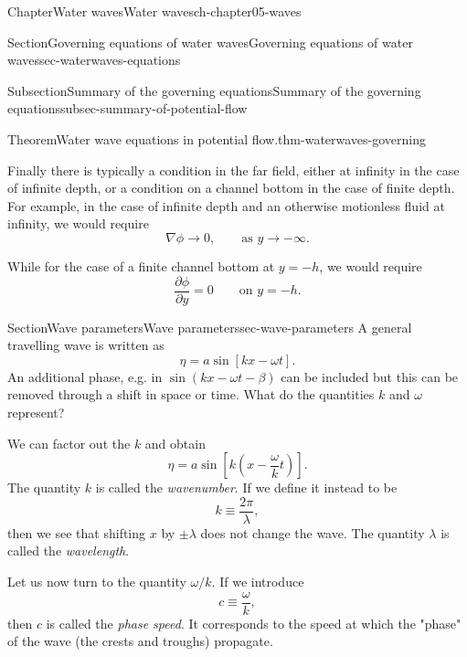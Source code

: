 \documentclass[oneside,10pt,]{book}
\numberwithin{equation}{section}
\newcommand{\pd}[2]{\frac{\partial#1}{\partial#2}}
\begin{document}
\begin{chapterptx}{Chapter}{Water waves}{}{Water waves}{}{}{ch-chapter05-waves}
\begin{sectionptx}{Section}{Governing equations of water waves}{}{Governing equations of water waves}{}{}{sec-waterwaves-equations}
\begin{subsectionptx}{Subsection}{Summary of the governing equations}{}{Summary of the governing equations}{}{}{subsec-summary-of-potential-flow}
\begin{theorem}{Theorem}{Water wave equations in potential flow.}{}{thm-waterwaves-governing}
%
\par
Finally there is typically a condition in the far field, either at infinity in the case of infinite depth, or a condition on a channel bottom in the case of finite depth. For example, in the case of infinite depth and an otherwise motionless fluid at infinity, we would require%
\begin{equation*}
\nabla \phi \to 0, \qquad \text{as $y \to -\infty$}.
\end{equation*}
%
\par
While for the case of a finite channel bottom at \(y = -h\), we would require%
\begin{equation*}
\pd{\phi}{y} = 0 \qquad \text{on $y = -h$}.
\end{equation*}
%
\end{theorem}
\end{subsectionptx}
\end{sectionptx}
%
%
\typeout{************************************************}
\typeout{************************************************}
%
\begin{sectionptx}{Section}{Wave parameters}{}{Wave parameters}{}{}{sec-wave-parameters}
A general travelling wave is written as%
\begin{equation}
\eta = a\sin\left[ kx - \omega t \right].\label{eqn-travelling-wave}
\end{equation}
An additional phase, e.g. in \(\sin(kx - \omega t - \beta)\) can be included but this can be removed through a shift in space or time. What do the quantities \(k\) and \(\omega\) represent?%
\par
We can factor out the \(k\) and obtain%
\begin{equation*}
\eta = a\sin \left[k\left( x - \frac{\omega}{k}t\right)\right].
\end{equation*}
The quantity \(k\) is called the \emph{wavenumber}. If we define it instead to be%
\begin{equation}
k \equiv \frac{2\pi}{\lambda},\label{eqn-wavenumber}
\end{equation}
then we see that shifting \(x\) by \(\pm \lambda\) does not change the wave. The quantity \(\lambda\) is called the \emph{wavelength}.%
\par
Let us now turn to the quantity \(\omega/k\). If we introduce%
\begin{equation}
c \equiv \frac{\omega}{k},\label{eqn-wavespeed}
\end{equation}
then \(c\) is called the \emph{phase speed}. It corresponds to the speed at which the "phase" of the wave (the crests and troughs) propagate.%

\end{sectionptx}
\end{chapterptx}
\end{document}
